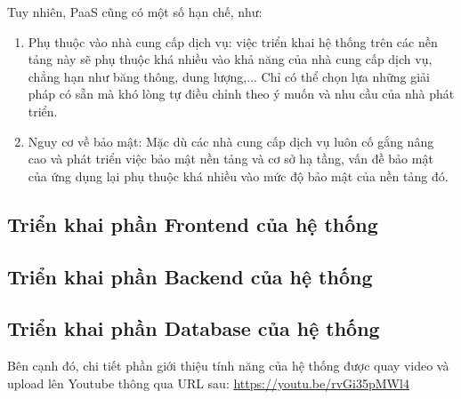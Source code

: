 Tuy nhiên, PaaS cũng có một số hạn chế, như:
\begin{enumerate}
    \item Phụ thuộc vào nhà cung cấp dịch vụ: việc triển khai hệ thống trên các nền tảng này sẽ phụ thuộc khá nhiều vào khả năng của nhà cung cấp dịch vụ, chẳng hạn như băng thông, dung lượng,... Chỉ có thể chọn lựa những giải pháp có sẵn mà khó lòng tự điều chỉnh theo ý muốn và nhu cầu của nhà phát triển.
    \item Nguy cơ về bảo mật: Mặc dù các nhà cung cấp dịch vụ luôn cố gắng nâng cao và phát triển việc bảo mật nền tảng và cơ sở hạ tầng, vấn đề bảo mật của ứng dụng lại phụ thuộc khá nhiều vào mức độ bảo mật của nền tảng đó.
\end{enumerate}

\subsection{Triển khai phần Frontend của hệ thống}

\subsection{Triển khai phần Backend của hệ thống}

\subsection{Triển khai phần Database của hệ thống}


Bên cạnh đó, chi tiết phần giới thiệu tính năng của hệ thống được quay video và upload lên Youtube thông qua URL sau: \url{https://youtu.be/rvGi35pMWl4}